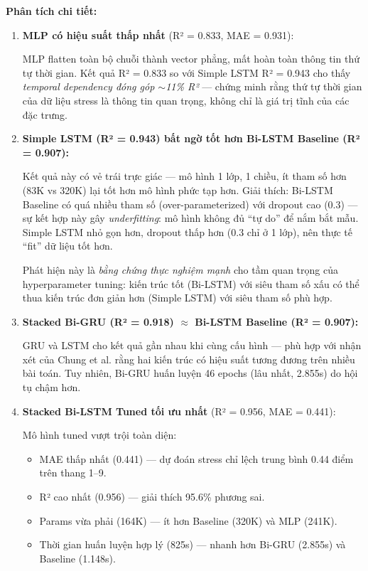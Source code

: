 \textbf{Phân tích chi tiết:}

\begin{enumerate}
    \item \textbf{MLP có hiệu suất thấp nhất} (R² = 0.833, MAE = 0.931):
    
    MLP flatten toàn bộ chuỗi thành vector phẳng, mất hoàn toàn thông tin thứ tự thời gian. Kết quả R² = 0.833 so với Simple LSTM R² = 0.943 cho thấy \textit{temporal dependency đóng góp $\sim$11\% R²} — chứng minh rằng thứ tự thời gian của dữ liệu stress là thông tin quan trọng, không chỉ là giá trị tĩnh của các đặc trưng.
    
    \item \textbf{Simple LSTM (R² = 0.943) bất ngờ tốt hơn Bi-LSTM Baseline (R² = 0.907):}
    
    Kết quả này có vẻ trái trực giác — mô hình 1 lớp, 1 chiều, ít tham số hơn (83K vs 320K) lại tốt hơn mô hình phức tạp hơn. Giải thích: Bi-LSTM Baseline có quá nhiều tham số (over-parameterized) với dropout cao (0.3) — sự kết hợp này gây \textit{underfitting}: mô hình không đủ ``tự do'' để nắm bắt mẫu. Simple LSTM nhỏ gọn hơn, dropout thấp hơn (0.3 chỉ ở 1 lớp), nên thực tế ``fit'' dữ liệu tốt hơn.
    
    Phát hiện này là \textit{bằng chứng thực nghiệm mạnh} cho tầm quan trọng của hyperparameter tuning: kiến trúc tốt (Bi-LSTM) với siêu tham số xấu có thể thua kiến trúc đơn giản hơn (Simple LSTM) với siêu tham số phù hợp.
    
    \item \textbf{Stacked Bi-GRU (R² = 0.918) $\approx$ Bi-LSTM Baseline (R² = 0.907):}
    
    GRU và LSTM cho kết quả gần nhau khi cùng cấu hình — phù hợp với nhận xét của Chung et al. \cite{chung2014empirical} rằng hai kiến trúc có hiệu suất tương đương trên nhiều bài toán. Tuy nhiên, Bi-GRU huấn luyện 46 epochs (lâu nhất, 2.855s) do hội tụ chậm hơn.
    
    \item \textbf{Stacked Bi-LSTM Tuned tối ưu nhất} (R² = 0.956, MAE = 0.441):
    
    Mô hình tuned vượt trội toàn diện:
    \begin{itemize}
        \item MAE thấp nhất (0.441) — dự đoán stress chỉ lệch trung bình 0.44 điểm trên thang 1--9.
        \item R² cao nhất (0.956) — giải thích 95.6\% phương sai.
        \item Params vừa phải (164K) — ít hơn Baseline (320K) và MLP (241K).
        \item Thời gian huấn luyện hợp lý (825s) — nhanh hơn Bi-GRU (2.855s) và Baseline (1.148s).
    \end{itemize}
    

\end{enumerate}
